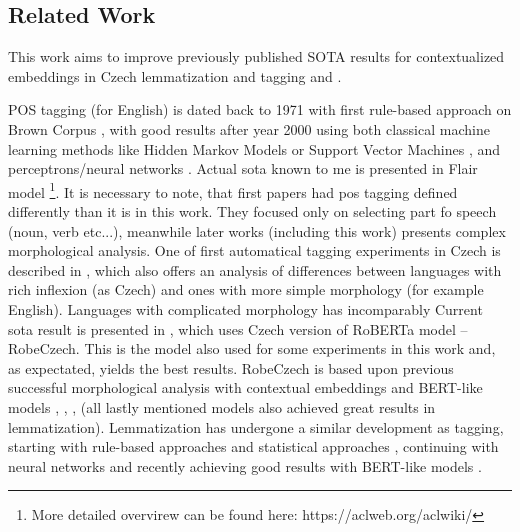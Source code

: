\subsection{Related Work}
This work aims to improve previously published SOTA results for contextualized embeddings in Czech lemmatization and tagging \citep{straka2019czech} and \citep{Straka2021}.

POS tagging (for English) is dated back to 1971 with first rule-based approach on Brown Corpus \citep{greene1971automatic}, with good results after year 2000 using both classical machine learning methods like Hidden Markov Models \citep{tnt} or Support Vector Machines \citep{svmtool}, and perceptrons/neural networks  \citep{collins-2002-discriminative}. Actual \acrlong{sota} known to me is presented in Flair model \citep{Akbik2018}\footnote{More detailed overvirew can be found here: https://aclweb.org/aclwiki/}. It is necessary to note, that first papers had \acrshort{pos} tagging defined differently than it is in this work. They focused only on selecting part fo speech (noun, verb etc...), meanwhile later works (including this work) presents  complex morphological analysis. %
One of first automatical tagging experiments in Czech is described in \citep{Hladka}, which also offers an analysis of differences between languages with rich inflexion (as Czech) and ones with more simple morphology (for example English). Languages with complicated morphology has incomparably   Current \acrshort{sota} result is presented in \citep{Straka2021}, which uses Czech version of RoBERTa model -- RobeCzech. This is the model also used for some experiments in this work and, as expectated,  yields the best results. RobeCzech is based upon previous successful morphological analysis with contextual embeddings and BERT-like models \citep{Straka2019b}, \citep{Straka2019a}, \citep{Straka2019}, \citep{Straka2018} (all lastly mentioned models also achieved great results in lemmatization). %
Lemmatization has undergone a similar development as tagging, starting with rule-based approaches and statistical approaches \citep{Plisson}, continuing with neural networks and recently achieving good results with BERT-like models \citep{Kondratyuk2019}.






